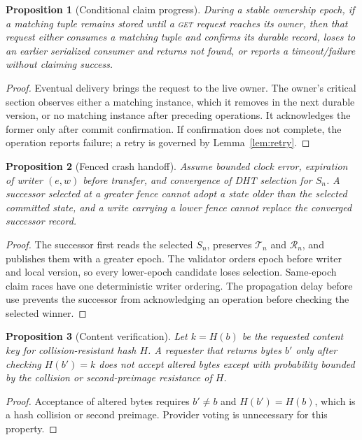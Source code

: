 \documentclass[conference]{IEEEtran}
\newcommand{\getop}{\textsc{get}\xspace}
\newtheorem{proposition}{Proposition}
\begin{document}
\begin{proposition}[Conditional claim progress]
During a stable ownership epoch, if a matching tuple remains stored until a
\getop request reaches its owner, then that request either consumes a matching
tuple and confirms its durable record, loses to an earlier serialized consumer
and returns not found, or reports a timeout/failure without claiming success.
\end{proposition}
\begin{proof}
Eventual delivery brings the request to the live owner. The owner's critical
section observes either a matching instance, which it removes in the next
durable version, or no matching instance after preceding operations. It
acknowledges the former only after commit confirmation. If confirmation does
not complete, the operation reports failure; a retry is governed by
Lemma~\ref{lem:retry}.
\end{proof}

\begin{proposition}[Fenced crash handoff]
\label{prop:handoff}
Assume bounded clock error, expiration of writer $(e,w)$ before transfer, and
convergence of DHT selection for $S_n$. A successor selected at a greater
fence cannot adopt a state older than the selected committed state, and a
write carrying a lower fence cannot replace the converged successor record.
\end{proposition}
\begin{proof}
The successor first reads the selected $S_n$, preserves
$\mathcal{T}_n$ and $\mathcal{R}_n$, and publishes them with a greater epoch.
The validator orders epoch before writer and local version, so every
lower-epoch candidate loses selection. Same-epoch claim races have one
deterministic writer ordering. The propagation delay before use prevents the
successor from acknowledging an operation before checking the selected
winner.
\end{proof}

\begin{proposition}[Content verification]
\label{prop:integrity}
Let $k=H(b)$ be the requested content key for collision-resistant hash $H$.
A requester that returns bytes $b'$ only after checking $H(b')=k$ does not
accept altered bytes except with probability bounded by the collision or
second-preimage resistance of $H$.
\end{proposition}
\begin{proof}
Acceptance of altered bytes requires $b'\ne b$ and $H(b')=H(b)$, which is a
hash collision or second preimage. Provider voting is unnecessary for this
property.
\end{proof}
\end{document}
